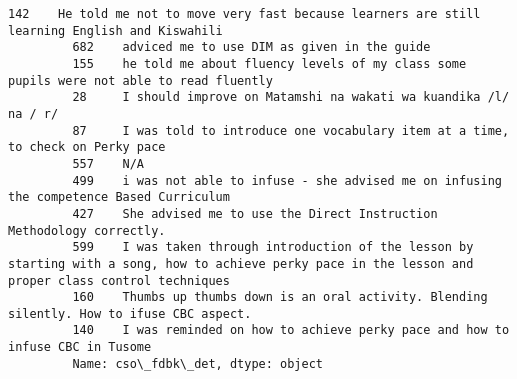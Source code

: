 \documentclass[11pt]{article}
\begin{document}
\begin{Verbatim}[commandchars=\\\{\}]
         142    He told me not to move very fast because learners are still learning English and Kiswahili                                                                                                                                                                              
         682    adviced me to use DIM as given in the guide                                                                                                                                                                                                                             
         155    he told me about fluency levels of my class some pupils were not able to read fluently                                                                                                                                                                                  
         28     I should improve on Matamshi na wakati wa kuandika /l/ na / r/                                                                                                                                                                                                          
         87     I was told to introduce one vocabulary item at a time, to check on Perky pace                                                                                                                                                                                           
         557    N/A                                                                                                                                                                                                                                                                     
         499    i was not able to infuse - she advised me on infusing the competence Based Curriculum                                                                                                                                                                                   
         427    She advised me to use the Direct Instruction Methodology correctly.                                                                                                                                                                                                     
         599    I was taken through introduction of the lesson by starting with a song, how to achieve perky pace in the lesson and proper class control techniques                                                                                                                     
         160    Thumbs up thumbs down is an oral activity. Blending silently. How to ifuse CBC aspect.                                                                                                                                                                                  
         140    I was reminded on how to achieve perky pace and how to infuse CBC in Tusome                                                                                                                                                                                             
         Name: cso\_fdbk\_det, dtype: object
\end{Verbatim}
            
\end{document}
